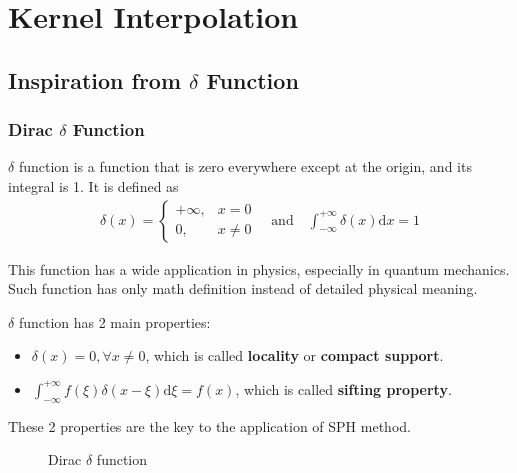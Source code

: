 \section{Kernel Interpolation}

\subsection{Inspiration from $\delta$ Function}

\subsubsection{Dirac $\delta$ Function}

$\delta$ function is a function that is zero everywhere except at the origin, 
and its integral is 1. It is defined as
\begin{equation}
    \begin{aligned}
        \delta(x) = 
        \begin{cases}
            +\infty, & x = 0 \\
            0, & x \neq 0
        \end{cases}
        \quad \text{and} \quad
        \int_{-\infty}^{+\infty} \delta(x) \mathrm{d}x = 1
    \end{aligned}
\end{equation}

This function has a wide application in physics, 
especially in quantum mechanics. 
Such function has only math definition instead of detailed physical meaning.

$\delta$ function has 2 main properties:
\begin{itemize}
    \item $\delta(x) = 0, \forall x \neq 0$, which is called \textbf{locality} or \textbf{compact support}.
    \item $\int_{-\infty}^{+\infty} f(\xi) \delta(x - \xi)\mathrm{d}\xi = f(x)$, which is called \textbf{sifting property}.
\end{itemize}

These 2 properties are the key to the application of SPH method.

\begin{figure}[H]
    \centering
    \caption{Dirac $\delta$ function}
    \label{fig:delta_function}
\end{figure}

